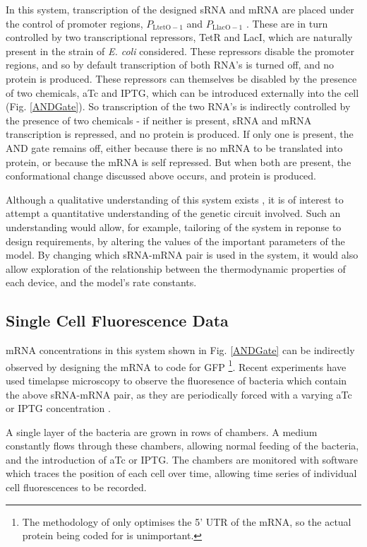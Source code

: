 \documentclass[10pt,journal]{./IEEE_latex_class/IEEEtran}
\begin{document}
In this system, transcription of the designed sRNA and mRNA are placed under the control of promoter regions, $P_{\mathrm{LtetO-1}}$ and $P_\mathrm{LlacO-1}$ \cite{Lutz1997}. These are in turn controlled by two transcriptional repressors, TetR and LacI, which are naturally present in the strain of \textit{E. coli} considered. These repressors disable the promoter regions, and so by default transcription of both RNA's is turned off, and no protein is produced. 
These repressors can themselves be disabled by the presence of two chemicals, aTc and IPTG, which can be introduced externally into the cell (Fig. \ref{ANDGate}).  So transcription of the two RNA's is indirectly controlled by the presence of two chemicals - if neither is present, sRNA and mRNA transcription is repressed, and no protein is produced. If only one is present, the AND gate remains off, either because there is no mRNA to be translated into protein, or because the mRNA is self repressed. But when both are present, the conformational change discussed above occurs, and protein is produced.

Although a qualitative understanding of this system exists \cite{Rodrigo2012}, it is of interest to attempt a quantitative understanding of the genetic circuit involved. Such an understanding would allow, for example, tailoring of the system in reponse to design requirements, by altering the values of the important parameters of the model. By changing which sRNA-mRNA pair is used in the system, it would also allow exploration of the relationship between the thermodynamic properties of each device, and the model's rate constants.
 
\subsection{Single Cell Fluorescence Data}

mRNA concentrations in this system shown in Fig. \ref{ANDGate} can be indirectly observed by designing the mRNA to code for GFP \footnote{ The methodology of \cite{Rodrigo2012} only optimises the 5' UTR of the mRNA, so the actual protein being coded for is unimportant.}. Recent experiments have used timelapse microscopy to observe the fluoresence of bacteria which contain the above sRNA-mRNA pair, as they are periodically forced with a varying aTc or IPTG concentration \cite{Jaramillo}. 

A single layer of the bacteria are grown in rows of chambers. A medium constantly flows through these chambers, allowing normal feeding of the bacteria, and the introduction of aTc or IPTG. The chambers are monitored with software which traces the position of each cell over time, allowing time series of individual cell fluorescences to be recorded.
\end{document}
